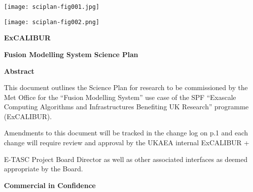 \documentclass{article}
\begin{document}
\vspace{72pt}
\texttt{[image: sciplan-fig001.jpg]}

\texttt{[image: sciplan-fig002.png]}

\vspace{60pt}
{\huge{}{\color{color30} \textbf{ExCALIBUR }}}

\vspace{12pt}
{\huge{}{\color{color30} \textbf{Fusion Modelling System Science Plan}}}

\vspace{28pt}
\baselineskip=12pt
{\color{color19} \textbf{Abstract}}

\vspace{3pt}
{\color{color29} This document outlines the Science Plan for research to be commissioned 
by the Met Office for the ``Fusion Modelling System'' use case of the SPF ``Exascale 
Computing Algorithms and Infrastructures Benefiting UK Research'' programme (ExCALIBUR). 
}

\vspace{3pt}
{\color{color29} Amendments to this document will be tracked in the change log 
on p.1 and each change will require review and approval by the UKAEA internal ExCALIBUR 
+ }

\vspace{3pt}
{\color{color29} E-TASC Project Board Director as well as other associated interfaces 
as deemed appropriate by the Board.}

\vspace{37pt}
\begin{flushright}
\baselineskip=12pt
{\color{color30} \textbf{Commercial in Confidence \pagebreak{}}}
\end{flushright}
\end{document}
